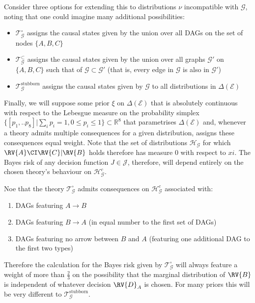 \begin{example}
Consider three options for extending this to distributions $\nu$ incompatible with $\mathcal{G}$, noting that one could imagine many additional possibilities:
\begin{itemize}
    \item $\mathscr{T}_{\mathcal{G}}^\circ$ assigns the causal states given by the union over all DAGs on the set of nodes $\{A, B, C\}$
    \item $\mathscr{T}_{\mathcal{G}}^\subset$ assigns the causal states given by the union over all graphs $\mathcal{G}'$ on $\{A, B, C\}$ such that of $\mathcal{G}\subset \mathcal{G}'$ (that is, every edge in $\mathcal{G}$ is also in $\mathcal{G}'$)
    \item $\mathscr{T}_{\mathcal{G}}^\mathrm{stubborn}$ assigns the causal states given by $\mathcal{G}$ to all distributions in $\Delta(\mathcal{E})$
\end{itemize}

Finally, we will suppose some prior $\xi$ on $\Delta(\mathcal{E})$ that is absolutely continuous with respect to the Lebesgue measure on the probability simplex $\{[p_1,..p_8]|\sum_i p_i=1,0\leq p_i \leq 1\}\subset\mathbb{R}^8$ that parametrises $\Delta(\mathcal{E})$ and, whenever a theory admits multiple consequences for a given distribution, assigns these consequences equal weight. Note that the set of distributions $\mathscr{H}_{\mathcal{G}}$ for which $\RV{A}\CI \RV{C} | \RV{B}$ holds therefore has measure 0 with respect to $xi$\cite{meek_strong_1995}. The Bayes risk of any decision function $J\in \mathscr{J}$, therefore, will depend entirely on the chosen theory's behaviour on $\mathscr{H}_{\mathcal{G}}^c$.

Noe that the theory $\mathscr{T}_{\mathcal{G}}^\circ$ admits consequences on $\mathscr{H}_{\mathcal{G}}^c$ associated with:
\begin{enumerate}
    \item DAGs featuring $A\to B$
    \item DAGs featuring $B\to A$ (in equal number to the first set of DAGs)
    \item DAGs featuring no arrow between $B$ and $A$ (featuring one additional DAG to the first two types)
\end{enumerate} 
Therefore the calculation for the Bayes risk given by $\mathscr{T}_{\mathcal{G}}^\circ$ will always feature a weight of more than $\tfrac{2}{3}$ on the possibility that the marginal distribution of $\RV{B}$ is independent of whatever decision $\RV{D}_A$ is chosen. For many priors this will be very different to $\mathscr{T}_{\mathcal{G}}^\mathrm{stubborn}$.


\end{example}
